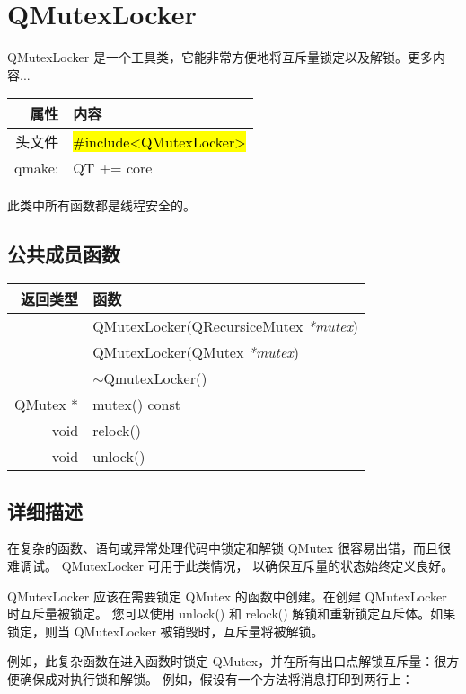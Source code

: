 \chapter{QMutexLocker}

QMutexLocker 是一个工具类，它能非常方便地将互斥量锁定以及解锁。更多内容...

\begin{tabular}{|r|l|}
	\hline
	属性 & 内容 \\
	\hline
    头文件  &	\hl{\#include<QMutexLocker>} \\
    \hline
    qmake: & QT += core    \\
	\hline
\end{tabular}

\begin{compactitem}[\arr]
\item 此类中所有函数都是线程安全的。
\end{compactitem}

\section{公共成员函数}

\begin{tabular}{|r|l|}   
    \hline
    返回类型 	& 函数 \\
    \hline
    & QMutexLocker(QRecursiceMutex \emph{*mutex}) \\ 
    \hline
	&QMutexLocker(QMutex \emph{*mutex}) \\ 
    \hline
	& $\sim$QmutexLocker() \\ 
\hline
QMutex * &	mutex() const \\
\hline
void 	& relock()\\
\hline
void 	& unlock() \\ 
    \hline 
\end{tabular}


\section{详细描述}

在复杂的函数、语句或异常处理代码中锁定和解锁 QMutex 很容易出错，而且很难调试。
QMutexLocker 可用于此类情况，
以确保互斥量的状态始终定义良好。

QMutexLocker 应该在需要锁定 QMutex 的函数中创建。在创建 QMutexLocker 时互斥量被锁定。
您可以使用 unlock() 和 relock() 解锁和重新锁定互斥体。如果锁定，则当 QMutexLocker 被销毁时，互斥量将被解锁。

例如，此复杂函数在进入函数时锁定 QMutex，并在所有出口点解锁互斥量：很方便确保成对执行锁和解锁。
例如，假设有一个方法将消息打印到两行上：

